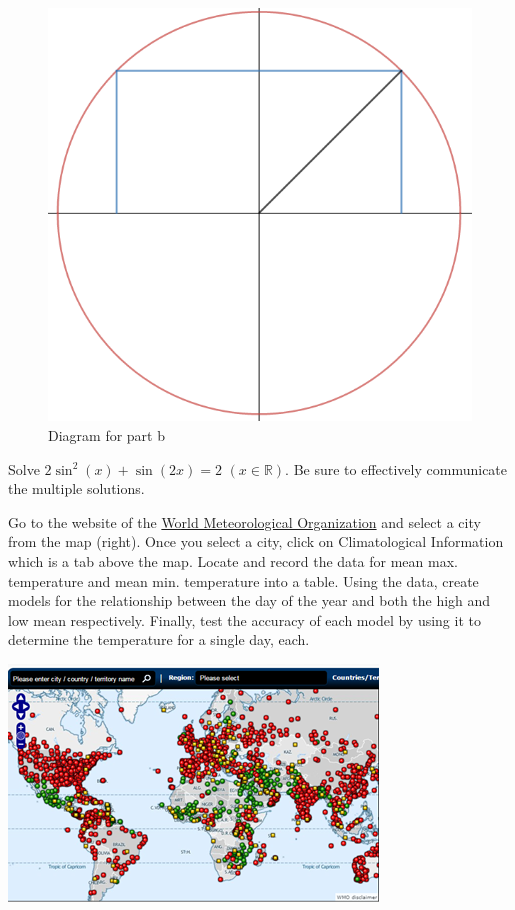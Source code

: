 \documentclass[12pt]{book}
\begin{document}
\begin{enumerate}
\begin{figure}[h]
\centering
\includegraphics[scale=0.25]{Inscribed2.png}
\caption{Diagram for part b}
\end{figure}

\newpage


\item Solve $2\sin^2(x) + \sin(2x) = 2$ $(x \in \mathbb{R})$. Be sure to effectively communicate the multiple solutions.


\newpage

\begin{minipage}{4in}
\item Go to the website of the \href{http://worldweather.wmo.int/}{World Meteorological Organization} and select a city from the map (right).
Once you select a city, click on Climatological Information which is a tab above the map. Locate and record the data for mean max. temperature and mean min. temperature into a table. Using the data, create models for the relationship between the day of the year and both the high and low mean respectively. Finally, test the accuracy of each model by using it to determine the temperature for a single day, each.
\end{minipage}\hspace{0.2in}
\begin{minipage}{1in}
\includegraphics[scale=0.75]{WorldMap.png}
\end{minipage}

\newpage


\end{enumerate}
\end{document}
